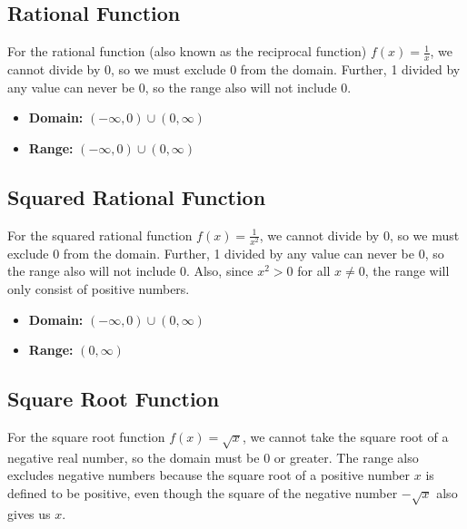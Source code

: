 \subsection{Rational Function}
\label{sss:rati-42db}

For the rational function (also known as the reciprocal function) $f(x) = \frac{1}{x}$, we cannot divide by 0, so we must exclude 0 from the domain. Further, 1 divided by any value can never be 0, so the range also will not include 0.


\begin{itemize}
    \item \textbf{Domain:} $(-\infty ,0) \cup (0 ,\infty)$
    \item \textbf{Range:} $(-\infty ,0) \cup (0 ,\infty)$
\end{itemize}

\subsection{Squared Rational Function}
\label{sss:squa-de87}

For the squared rational function $f(x) = \frac{1}{x^2}$, we cannot divide by 0, so we must exclude 0 from the domain. Further, 1 divided by any value can never be 0, so the range also will not include 0. Also, since $x^2 > 0$ for all $x \neq 0$, the range will only consist of positive numbers.


\begin{itemize}
    \item \textbf{Domain:} $(-\infty ,0) \cup (0 ,\infty)$
    \item \textbf{Range:} $(0 ,\infty)$
\end{itemize}

\subsection{Square Root Function}
\label{sss:squa-a510}

For the square root function $f(x) = \sqrt{x}$, we cannot take the square root of a negative real number, so the domain must be 0 or greater. The range also excludes negative numbers because the square root of a positive number $x$ is defined to be positive, even though the square of the negative number $-\sqrt{x}$ also gives us $x$.

